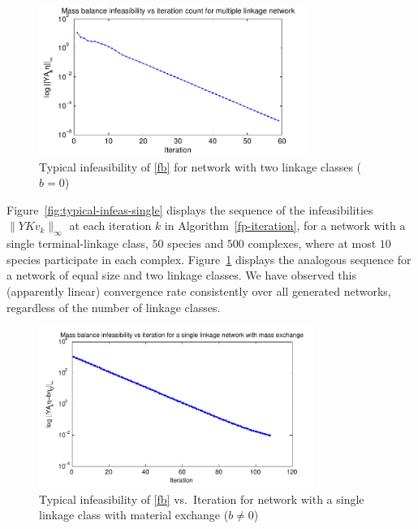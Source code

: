 \documentclass[smallextended]{svjour3}       %
\newcommand*{\0}{\mathbf{0}}
\newcommand*{\1}{\mathbf{1}}
\begin{document}
\begin{figure}%
   \centering
   \includegraphics[width=0.78\textwidth]{InfeasibilityVsIterationMultiple}
   \caption{Typical infeasibility of \eqref{fb} for network with
            two linkage classes ($b=0$)}
   \label{fig:typical-infeas-multiple}
\end{figure}

Figure~\ref{fig:typical-infeas-single} displays the sequence of the
infeasibilities $\|YKv_k\|_\infty$ at each iteration $k$ in
Algorithm~\ref{fp-iteration}, for a network with a single
terminal-linkage class, $50$ species and $500$ complexes, where at
most $10$ species participate in each
complex. Figure~\ref{fig:typical-infeas-multiple} displays the
analogous sequence for a network of equal size and two
linkage classes.  We have observed this (apparently linear)
convergence rate consistently over all generated networks, regardless
of the number of linkage classes.

\begin{figure}%
   \centering 
   \includegraphics[width=0.8\textwidth]{InfeasibilityVsIterationOpen}
   \caption{Typical infeasibility of \eqref{fb} vs.\ Iteration for network with a
            single linkage class with material exchange ($b\neq0$)} 
   \label{fig:typical-infeas-single-open} 
\end{figure}
\end{document}
